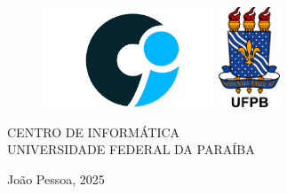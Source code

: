 \documentclass{tcc}
\begin{document}
\pagestyle{empty} %


\begin{center}
\LARGE{\bf \thetitle}\\
\end{center}

\vspace{1em}

\begin{center}
\theauthor
\end{center}

\vfill

\begin{figure}[H]
\centering
\includegraphics[height=3cm]{figures/ci_logo.png}
\hspace{1cm}
\includegraphics[height=3cm]{figures/ufpb_logo.png}
\end{figure}

\begin{center}
CENTRO DE INFORMÁTICA \\
UNIVERSIDADE FEDERAL DA PARAÍBA
\end{center}

\vspace{2in}

\begin{center}
João Pessoa, 2025
\end{center}
\afterpage{\blankpage \addtocounter{page}{1}}

\newpage
\begin{center}
\theauthor
\end{center}
\vspace{3in}
\begin{center}
\LARGE{\thetitle}\\
\end{center}

\vspace{2in}
\end{document}
